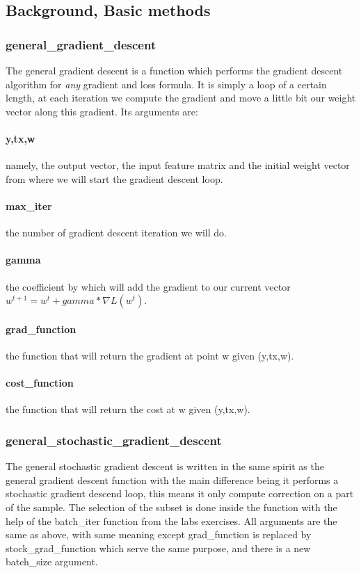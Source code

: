 \documentclass[10pt,conference,compsocconf]{IEEEtran}
\begin{document}
\subsection{Background, Basic methods}
\subsubsection{general\_gradient\_descent}
The general gradient descent is a function which performs the gradient descent algorithm for \emph{any} gradient and loss formula. It is simply a loop of a certain length, at each iteration we compute the gradient and move a little bit our weight vector along this gradient. Its arguments are:
\paragraph{y,tx,w} namely, the output vector, the input feature matrix and the initial weight vector from where we will start the gradient descent loop.
\paragraph{max\_iter} the number of gradient descent iteration we will do.
\paragraph{gamma} the coefficient by which will add the gradient to our current vector \(w^{t+1}=w^{t}+gamma*\nabla L(w^{t})\).
\paragraph{grad\_function} the function that will return the gradient at point w given (y,tx,w).
\paragraph{cost\_function} the function that will return the cost at w given (y,tx,w).


\subsubsection{general\_stochastic\_gradient\_descent}
The general stochastic gradient descent is written in the same spirit as the general gradient descent function with the main difference being it performs a stochastic gradient descend loop, this means it only compute correction on a part of the sample. The selection of the subset is done inside the function with the help of the batch\_iter function from the labs exercises. All arguments are the same as above, with same meaning except grad\_function is replaced by stock\_grad\_function which serve the same purpose, and there is a new batch\_size argument.
\end{document}
